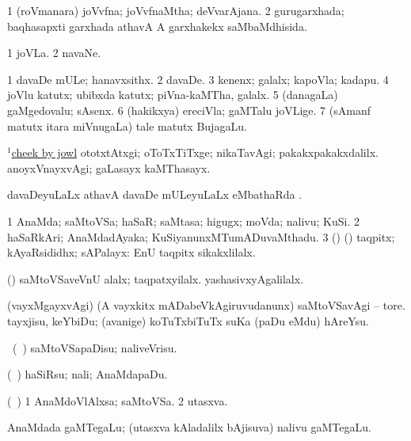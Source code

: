 \bentry
{}
\gl{\gu}
\bmng
\bnum
\num{1} (roVmanara) joVvfna; joVvfnaMtha; deVvarAjana. 
\num{2} gurugarxhada; baqhasapxti garxhada athavA A garxhakekx saMbaMdhisida. 
\enum
\emng
\eentry

\bentry
{}
\gl{\nA}
\bmng
\bnum
\num{1} joVLa. 
\num{2} navaNe. 
\enum
\emng
\eentry

\bentry
{}
\gl{\nA}
\bmng
\bnum
\num{1} davaDe mULe; hanavxsithx. 
\num{2} davaDe. 
\num{3} kenenx; galalx; kapoVla; kadapu. 
\num{4} joVlu katutx; ubibxda katutx; piVna-kaMTha, galalx. 
\num{5} (danagaLa) gaMgedovalu; sAsenx. 
\num{6} (hakikxya) ereciVla; gaMTalu joVLige. 
\num{7} (sAmanf matutx itara miVnugaLa) tale matutx BujagaLu. 
\enum
\emng

\noindent
\gl{\nuga}
\bmng
\hyperref{kandict_c.pdf}{C}{cheek(1) nuga(1)}{$^1$cheek by jowl} 
\banum
{} ototxtAtxgi; oToTxTiTxge; nikaTavAgi; pakakxpakakxdalilx. 
 anoyxVnayxvAgi; gaLasayx kaMThasayx. 
\eanum
\emng
\eentry

\bentry
{}
\gl{\saupa}
\bmng
davaDeyuLaLx athavA davaDe mULeyuLaLx eMbathaRda \saupa. 
\emng
\eentry

\bentry
{}
\gl{\nA}
\bmng
\bnum
\num{1} AnaMda; saMtoVSa; haSaR; saMtasa; higugx; moVda; nalivu; KuSi. 
\num{2} haSaRkAri; AnaMdadAyaka; KuSiyanunxMTumADuvaMthadu. 
\num{3} (\birx) (\AmA) taqpitx; kAyaRsididhx; sAPalayx:  EnU taqpitx sikakxlilalx. 
\enum
\emng

\noindent
\gl{\pagu}
\bmng
{} (\AmA) 
\banum
{} saMtoVSaveVnU alalx; taqpatxyilalx. 
 yashasivxyAgalilalx. 
\eanum
\emng

\noindent
\gl{\nuga}
\bmng
{} 
 (vayxMgayxvAgi) (A vayxkitx mADabeVkAgiruvudanunx) saMtoVSavAgi -- tore. tayxjisu, keYbiDu; (avanige) koTuTxbiTuTx suKa (paDu eMdu) hAreYsu. 
\emng
\eentry

\bentry
{}
\gl{\kirx}
\bmng
\sakirx\ (\kanmu\ \kAparx) saMtoVSapaDisu; naliveVrisu. 
\emng

\noindent
\gl{\akirx}
\bmng
(\kanmu\ \kAparx) haSiRsu; nali; AnaMdapaDu. 
\emng
\eentry

\bentry
{}
\gl{\nA}
\bmng
(\kanmu\ \kAparx) 
\bnum
\num{1} AnaMdoVlAlxsa; saMtoVSa. 
\num{2} utasxva. 
\enum
\emng
\eentry

\bentry
{}
\gl{\nA}
\bmng
AnaMdada gaMTegaLu; (utasxva kAladalilx bAjisuva) nalivu gaMTegaLu. 
\emng
\eentry

